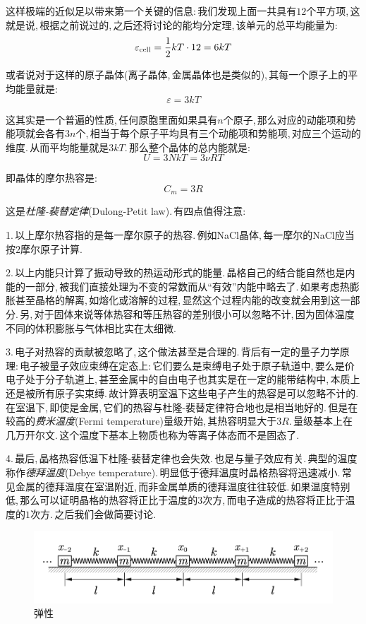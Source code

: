 这样极端的近似足以带来第一个关键的信息:\,我们发现上面一共具有$12$个平方项,\,这就是说,\,根据之前说过的,\,之后还将讨论的能均分定理,\,该单元的总平均能量为:
\[\varepsilon_{\rm cell}=\frac{1}{2}kT\cdot 12=6kT\]

或者说对于这样的原子晶体(离子晶体,\,金属晶体也是类似的),\,其每一个原子上的平均能量就是:
\[\varepsilon=3kT\]

这其实是一个普遍的性质,\,任何原胞里面如果具有$n$个原子,\,那么对应的动能项和势能项就会各有$3n$个,\,相当于每个原子平均具有三个动能项和势能项,\,对应三个运动的维度.\,从而平均能量就是$3kT$.\,那么整个晶体的总内能就是:
\[U=3NkT=3\nu RT\]

即晶体的摩尔热容是:
\[C_{m}=3R\]

这是\emph{杜隆-裴替定律}(Dulong-Petit law).\,有四点值得注意:

1.\,以上摩尔热容指的是每一摩尔原子的热容.\,例如NaCl晶体,\,每一摩尔的NaCl应当按$2$摩尔原子计算.

2.\,以上内能只计算了振动导致的热运动形式的能量.\,晶格自己的结合能自然也是内能的一部分,\,被我们直接处理为不变的常数而从``有效''内能中略去了.\,如果考虑热膨胀甚至晶格的解离,\,如熔化或溶解的过程,\,显然这个过程内能的改变就会用到这一部分.\,另,\,对于固体来说等体热容和等压热容的差别很小可以忽略不计,\,因为固体温度不同的体积膨胀与气体相比实在太细微.

3.\,电子对热容的贡献被忽略了,\,这个做法甚至是合理的.\,背后有一定的量子力学原理:\,电子被量子效应束缚在定态上:\,它们要么是束缚电子处于原子轨道中,\,要么是价电子处于分子轨道上,\,甚至金属中的自由电子也其实是在一定的能带结构中,\,本质上还是被所有原子实束缚.\,故计算表明室温下这些电子产生的热容是可以忽略不计的.\,在室温下,\,即使是金属,\,它们的热容与杜隆-裴替定律符合地也是相当地好的.\,但是在较高的\emph{费米温度}(Fermi temperature)量级开始,\,其热容明显大于$3R$.\,量级基本上在几万开尔文.\,这个温度下基本上物质也称为等离子体态而不是固态了.

4.\,最后,\,晶格热容低温下杜隆-裴替定律也会失效.\,也是与量子效应有关.\,典型的温度称作\emph{德拜温度}(Debye temperature).\,明显低于德拜温度时晶格热容将迅速减小.\,常见金属的德拜温度在室温附近,\,而非金属单质的德拜温度往往较低.\,如果温度特别低,\,那么可以证明晶格的热容将正比于温度的$3$次方,\,而电子造成的热容将正比于温度的$1$次方.\,之后我们会做简要讨论.

\begin{figure}[H]
\centering
\includegraphics[width=15cm]{image/5-3-5.png}
\caption{弹性}
\end{figure}

